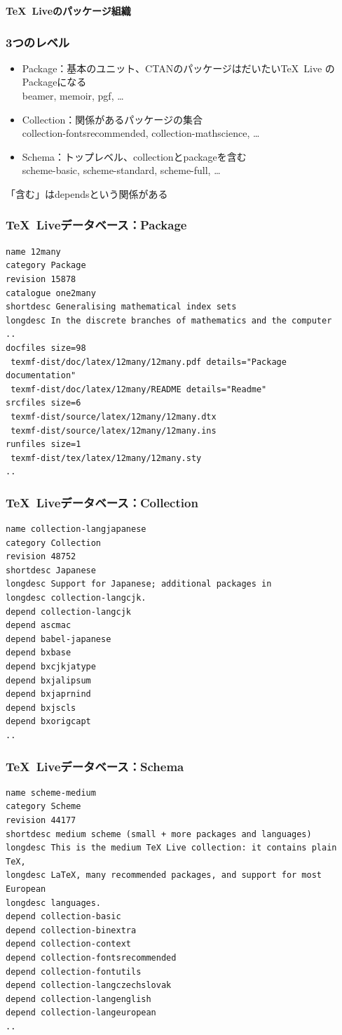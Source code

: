\documentclass[hyperref]{beamer}
\newcommand{\tl}{\TeX~Live}
\newcommand{\acro}[1]{\acro{\MakeLowercase{#1}}}
\newcommand{\bis}{\\[\bigskipamount]}
\renewcommand{\acro}[1]{#1}
\newcommand{\cutin}[1]{%
  \begin{frame}[c]
    \begin{center}
      {\Large\bf\usebeamercolor[fg]{structure}#1}
    \end{center}
  \end{frame}
}
\begin{document}
\cutin{\tl のパッケージ組織}

\begin{frame}
  \frametitle{3つのレベル}
  \begin{itemize}
  \item Package：基本のユニット、\acro{CTAN}のパッケージはだいたい\tl
    のPackageになる\\
    beamer, memoir, pgf, \ldots\bis
  \item Collection：関係があるパッケージの集合\\
    collection-fontsrecommended, collection-mathscience, \ldots\bis
  \item Schema：トップレベル、collectionとpackageを含む\\
    scheme-basic, scheme-standard, scheme-full, \ldots
  \end{itemize}

  「含む」はdependsという関係がある
\end{frame}

\begin{frame}
  \frametitle{\tl データベース：Package}
\begin{lstlisting}
name 12many
category Package
revision 15878
catalogue one2many
shortdesc Generalising mathematical index sets
longdesc In the discrete branches of mathematics and the computer
..
docfiles size=98
 texmf-dist/doc/latex/12many/12many.pdf details="Package documentation"
 texmf-dist/doc/latex/12many/README details="Readme"
srcfiles size=6
 texmf-dist/source/latex/12many/12many.dtx
 texmf-dist/source/latex/12many/12many.ins
runfiles size=1
 texmf-dist/tex/latex/12many/12many.sty
..
\end{lstlisting}
\end{frame}

\begin{frame}
  \frametitle{\tl データベース：Collection}
\begin{lstlisting}
name collection-langjapanese
category Collection
revision 48752
shortdesc Japanese
longdesc Support for Japanese; additional packages in
longdesc collection-langcjk.
depend collection-langcjk
depend ascmac
depend babel-japanese
depend bxbase
depend bxcjkjatype
depend bxjalipsum
depend bxjaprnind
depend bxjscls
depend bxorigcapt
..
\end{lstlisting}
\end{frame}

\begin{frame}
  \frametitle{\tl データベース：Schema}
\begin{lstlisting}
name scheme-medium
category Scheme
revision 44177
shortdesc medium scheme (small + more packages and languages)
longdesc This is the medium TeX Live collection: it contains plain TeX,
longdesc LaTeX, many recommended packages, and support for most European
longdesc languages.
depend collection-basic
depend collection-binextra
depend collection-context
depend collection-fontsrecommended
depend collection-fontutils
depend collection-langczechslovak
depend collection-langenglish
depend collection-langeuropean
..
\end{lstlisting}
\end{frame}
\end{document}
